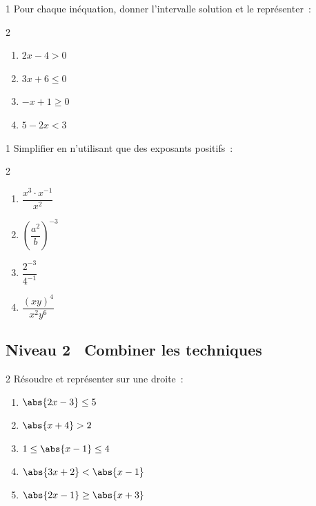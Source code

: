 \begin{exo}{1}
Pour chaque in\'equation, donner l'intervalle solution et le repr\'esenter~:
\begin{multicols}{2}
\begin{enumerate}
  \item $2x - 4 > 0$
  \item $3x + 6 \leq 0$
  \item $-x + 1 \geq 0$
  \item $5 - 2x < 3$
\end{enumerate}
\end{multicols}
\end{exo}

\begin{exo}{1}
Simplifier en n'utilisant que des exposants positifs~:
\begin{multicols}{2}
\begin{enumerate}
  \item $\dfrac{x^3 \cdot x^{-1}}{x^2}$
  \item $\left(\dfrac{a^2}{b}\right)^{-3}$
  \item $\dfrac{2^{-3}}{4^{-1}}$
  \item $\dfrac{(xy)^4}{x^2 y^6}$
\end{enumerate}
\end{multicols}
\end{exo}

\subsection*{\quad Niveau 2 \textemdash\ Combiner les techniques}

\begin{exo}{2}
R\'esoudre et repr\'esenter sur une droite~:
\begin{enumerate}
  \item $\abs{2x-3} \leq 5$
  \item $\abs{x+4} > 2$
  \item $1 \leq \abs{x-1} \leq 4$
  \item $\abs{3x+2} < \abs{x-1}$
  \item $\abs{2x-1} \geq \abs{x+3}$
\end{enumerate}
\end{exo}

